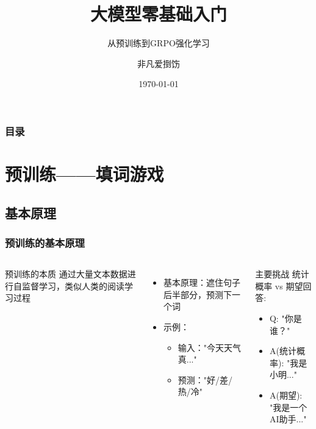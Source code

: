 \documentclass[8pt,aspectratio=169]{beamer}
\title{大模型零基础入门}         %
\subtitle{从预训练到GRPO强化学习} %
\author{非凡爱捯饬}               %
\institute{河南大学}    %
\date{\today}                   %
\begin{document}
\begin{frame}
    \titlepage  
\end{frame}

\begin{frame}
    \frametitle{目录}
    \tableofcontents
\end{frame}

\section{预训练——填词游戏}
\subsection{基本原理}
\begin{frame}
    \frametitle{预训练的基本原理}
    \begin{columns}[T]
        \begin{block}{预训练的本质}
            通过大量文本数据进行自监督学习，类似人类的阅读学习过程
        \end{block}
        
        \begin{itemize}
            \item 基本原理：遮住句子后半部分，预测下一个词
            \item 示例：
                \begin{itemize}
                    \item 输入："今天天气真..."
                    \item 预测："好/差/热/冷"
                \end{itemize}
        \end{itemize}

        \begin{alertblock}{主要挑战}
            统计概率 vs 期望回答:
            \begin{itemize}
                \item Q: "你是谁？"
                \item A(统计概率): "我是小明..."
                \item A(期望): "我是一个AI助手..."
            \end{itemize}
        \end{alertblock}
    \end{columns}
\end{frame}
\end{document}
